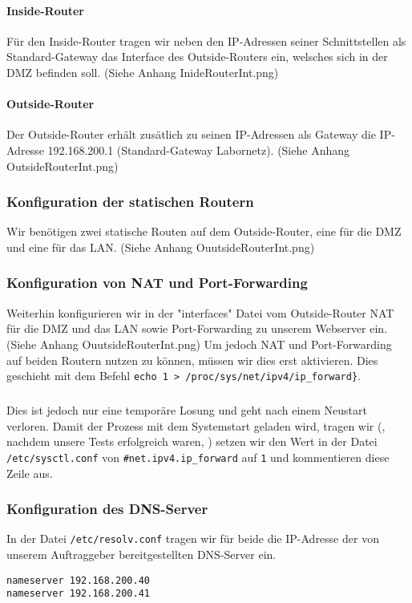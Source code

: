 \paragraph*{Inside-Router} Für den Inside-Router tragen wir neben den IP-Adressen seiner Schnittstellen als Standard-Gateway das Interface des Outside-Routers ein, welsches sich in der DMZ befinden soll. (Siehe Anhang InideRouterInt.png)

\paragraph*{Outside-Router} Der Outside-Router erhält zusätlich zu seinen IP-Adressen als Gateway die IP-Adresse 192.168.200.1 (Standard-Gateway Labornetz). (Siehe Anhang OutsideRouterInt.png)

\subsubsection{Konfiguration der statischen Routern}
\label{subsubsec:KonfigurationStatischeRouten}
Wir benötigen zwei statische Routen auf dem Outside-Router, eine für die DMZ und eine für das LAN. (Siehe Anhang OuutsideRouterInt.png)

\subsubsection{Konfiguration von NAT und Port-Forwarding}
\label{subsubsec:KonfigurationNAT}
Weiterhin konfigurieren wir in der "interfaces" Datei vom Outside-Router NAT für die DMZ und das LAN sowie Port-Forwarding zu unserem Webserver ein. (Siehe Anhang OuutsideRouterInt.png)
Um jedoch NAT und Port-Forwarding auf beiden Routern nutzen zu können, müssen wir dies erst aktivieren. Dies geschieht mit dem Befehl
\verb+echo 1 > /proc/sys/net/ipv4/ip_forward}+.

\subparagraph*{}  Dies ist jedoch nur eine temporäre Losung und geht nach einem Neustart verloren. Damit der Prozess mit dem Systemstart geladen wird, tragen wir (, nachdem unsere Tests erfolgreich waren, ) setzen wir den Wert in der Datei \texttt{/etc/sysctl.conf} von  \verb+#net.ipv4.ip_forward+ auf \verb+1+ und kommentieren diese Zeile aus.

\subsubsection{Konfiguration des DNS-Server}
\label{subsubsec:KonfigurationLinuxDNS}
In der Datei \verb+/etc/resolv.conf+ tragen wir für beide die IP-Adresse der von unserem Auftraggeber bereitgestellten DNS-Server ein.
\begin{verbatim}
nameserver 192.168.200.40
nameserver 192.168.200.41
\end{verbatim}

